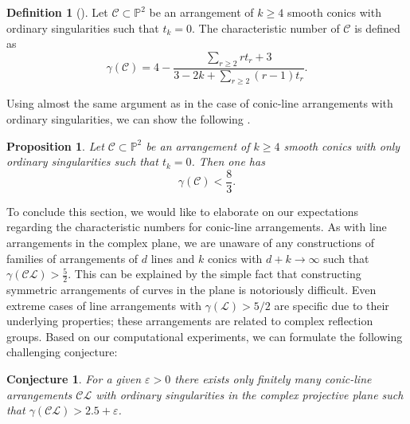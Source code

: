 \documentclass{article}
\theoremstyle{plain}
\newtheorem{proposition}[thm]{Proposition}
\newtheorem{conjecture}[thm]{Conjecture}
\theoremstyle{definition}
\newtheorem{definition}[thm]{Definition}
\numberwithin{equation}{section}
\begin{document}
\begin{definition}[{\cite[p. 439]{Tang}}]
Let $\mathcal{C}\subset \mathbb{P}^{2}$ be an arrangement of $k\geq 4$ smooth conics with ordinary singularities such that $t_{k}=0$. The characteristic number of $\mathcal{C}$ is defined as
\[\gamma(\mathcal{C})= 4 - \dfrac{\sum_{r\geq 2}rt_{r}+3}{3-2k + \sum_{r\geq 2}(r-1)t_{r}}.\]
\end{definition}
Using almost the same argument as in the case of conic-line arrangements with ordinary singularities, we can show the following \cite{Pokora1}.
\begin{proposition}
Let $\mathcal{C}\subset \mathbb{P}^{2}$ be an arrangement of $k\geq 4$ smooth conics with only ordinary singularities such that $t_{k}=0$. Then one has
\[\gamma(\mathcal{C}) < \frac{8}{3}.\]
\end{proposition}
To conclude this section, we would like to elaborate on our expectations regarding the characteristic numbers for conic-line arrangements. As with line arrangements in the complex plane, we are unaware of any constructions of families of arrangements of $d$ lines and $k$ conics with $d+k \rightarrow \infty$ such that $\gamma(\mathcal{CL}) > \frac{5}{2}$. This can be explained by the simple fact that constructing symmetric arrangements of curves in the plane is notoriously difficult. Even extreme cases of line arrangements with $\gamma(\mathcal{L}) > 5/2$ are specific due to their underlying properties; these arrangements are related to complex reflection groups. Based on our computational experiments, we can formulate the following challenging conjecture:

\begin{conjecture}
For a given $\varepsilon >0$ there exists only finitely many conic-line arrangements $\mathcal{CL}$ with ordinary singularities in the complex projective plane such that $\gamma(\mathcal{CL}) > 2.5 + \varepsilon$.
\end{conjecture}
 
\end{document}
